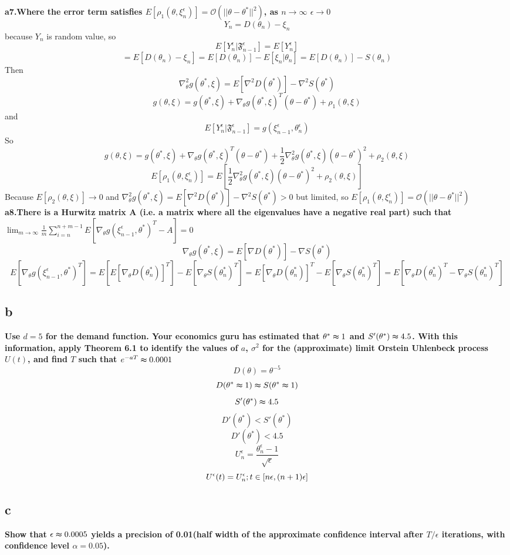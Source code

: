 \documentclass{article}
\begin{document}
\textbf{a7.Where the error term satisfies $ E[\rho_1(\theta,\xi_n^\epsilon)]=\mathcal{O}(||\theta-\theta^*||^2) $, as $n\rightarrow \infty$ $ \epsilon \rightarrow 0$}  \\
$$ Y_n = D(\theta_n)-\xi_n $$	
because $Y_n$ is random value, so 
$$ E[Y_n^\epsilon|\mathfrak{F}_{n-1}^\epsilon] = E[Y_n^\epsilon] $$
$$ = E[D(\theta_n)-\xi_n] = E[D(\theta_n)] - E[\xi_n|\theta_n] = E[D(\theta_n)] - S(\theta_n) $$
Then
$$ \nabla_\theta^2g(\theta^*, \xi) = E[\nabla^2D(\theta^*)] - \nabla^2 S(\theta^*) $$
$$ g(\theta,\xi) = g(\theta^*, \xi)+\nabla_\theta g(\theta^*,\xi)^T(\theta-\theta^*)+\rho_1(\theta, \xi) $$
and
$$ E[Y_n^\epsilon|\mathfrak{F}_{n-1}^\epsilon]  = g(\xi_{n-1}^\epsilon,\theta_n^\epsilon) $$
So
$$ g(\theta,\xi) = g(\theta^*, \xi)+\nabla_\theta g(\theta^*,\xi)^T(\theta-\theta^*) + \frac{1}{2}\nabla_\theta^2g(\theta^*, \xi)(\theta-\theta^*)^2+\rho_2(\theta, \xi) $$
$$ E[\rho_1(\theta,\xi_n^\epsilon)] = E[\frac{1}{2}\nabla_\theta^2g(\theta^*, \xi)(\theta-\theta^*)^2+\rho_2(\theta, \xi)] $$
Because $E[\rho_2(\theta, \xi)] \rightarrow 0$ and $\nabla_\theta^2g(\theta^*,\xi) = E[\nabla^2D(\theta^*)] - \nabla^2 S(\theta^*) > 0 $ but limited, so  $E[\rho_1(\theta,\xi_n^\epsilon)]=\mathcal{O}(||\theta-\theta^*||^2)$ \\

\textbf{a8.There is a Hurwitz matrix A (i.e. a matrix where all the eigenvalues have a negative real part) such that $ \lim_{m\rightarrow\infty}\frac{1}{m}\sum\limits_{i=n}^{n+m-1}E[\nabla_\theta g(\xi_{n-1}^\epsilon,\theta^*)^T-A]=0 $}  \\
$$ \nabla_\theta g(\theta^*, \xi) = E[\nabla D(\theta^*)] - \nabla S(\theta^*) $$
$$ E[\nabla_\theta g(\xi_{n-1}^\epsilon,\theta^*)^T] = E[E[\nabla_\theta D(\theta_n^*)]^T] - E[\nabla_\theta S(\theta_n^*)^T] = E[\nabla_\theta D(\theta_n^*)]^T - E[\nabla_\theta S(\theta_n^*)^T] = E[\nabla_\theta D(\theta_n^*)^T-\nabla_\theta S(\theta_n^*)^T] $$

\subsection{b}
\textbf{Use $ d = 5 $ for the demand function. Your economics guru has estimated that $ \theta^*\thickapprox 1$ and $ S'(\theta^*)\thickapprox4.5$. With this information, apply Theorem 6.1 to identify the values of $a$, $\sigma^2$ for the (approximate) limit Orstein Uhlenbeck process $U(t)$, and find $T$ such that $e^{-aT}\thickapprox0.0001$}  \\
$$ D(\theta) = \theta^{-5} $$ 
$$ D(\theta^*\thickapprox 1) \thickapprox S(\theta^*\thickapprox 1) $$
$$ S'(\theta^*)\thickapprox4.5 $$
$$ D'(\theta^*)<S'(\theta^*) $$
$$ D'(\theta^*)<4.5 $$
$$ U_n^\epsilon  = \frac{\theta_n^\epsilon-1}{\sqrt{\epsilon}} $$
$$ U^\epsilon(t) = U_n^\epsilon; \space\space t\in[n\epsilon, (n+1)\epsilon] $$


\subsection{c}
\textbf{Show that $\epsilon\thickapprox0.0005$ yields a precision of 0.01(half width of the approximate confidence interval after $T/\epsilon$ iterations, with confidence level $\alpha=0.05$). }
\end{document}
